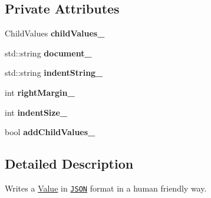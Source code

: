 \subsection*{Private Attributes}
\begin{DoxyCompactItemize}
\item 
\hypertarget{class_json_1_1_styled_writer_a1f905495f0705365af117ec541e29fdf}{Child\-Values {\bfseries child\-Values\-\_\-}}\label{class_json_1_1_styled_writer_a1f905495f0705365af117ec541e29fdf}

\item 
\hypertarget{class_json_1_1_styled_writer_ac092c93313e7ab202b13e075d682faea}{std\-::string {\bfseries document\-\_\-}}\label{class_json_1_1_styled_writer_ac092c93313e7ab202b13e075d682faea}

\item 
\hypertarget{class_json_1_1_styled_writer_a98a33f1d4c853a4dbf87ca17499c5830}{std\-::string {\bfseries indent\-String\-\_\-}}\label{class_json_1_1_styled_writer_a98a33f1d4c853a4dbf87ca17499c5830}

\item 
\hypertarget{class_json_1_1_styled_writer_a9c8fc62cb4f3b4a6dbed470fea2aa567}{int {\bfseries right\-Margin\-\_\-}}\label{class_json_1_1_styled_writer_a9c8fc62cb4f3b4a6dbed470fea2aa567}

\item 
\hypertarget{class_json_1_1_styled_writer_ae911f06042935286c24a9fb23dba78bd}{int {\bfseries indent\-Size\-\_\-}}\label{class_json_1_1_styled_writer_ae911f06042935286c24a9fb23dba78bd}

\item 
\hypertarget{class_json_1_1_styled_writer_acaabfa48b50a8bb7fa9ce98e2ae971d9}{bool {\bfseries add\-Child\-Values\-\_\-}}\label{class_json_1_1_styled_writer_acaabfa48b50a8bb7fa9ce98e2ae971d9}

\end{DoxyCompactItemize}


\subsection{Detailed Description}
Writes a \hyperlink{class_json_1_1_value}{Value} in \href{http://www.json.org}{\tt J\-S\-O\-N} format in a human friendly way. 


